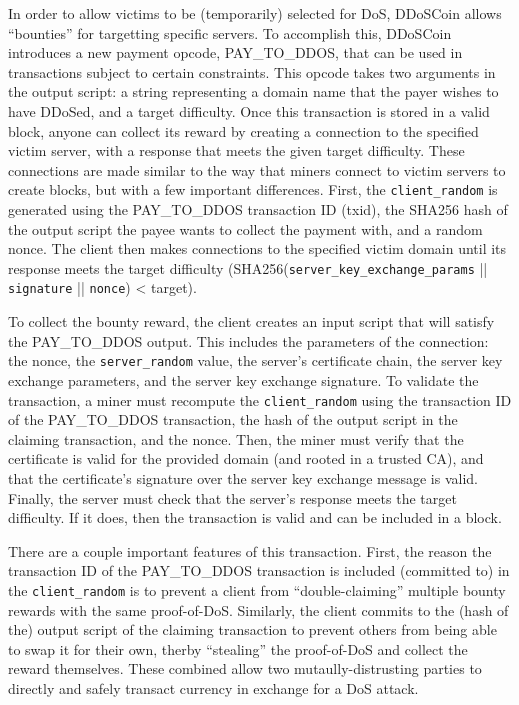 In order to allow victims to be (temporarily) selected for DoS, DDoSCoin
allows ``bounties'' for targetting specific servers. To accomplish this,
DDoSCoin introduces a new payment opcode, PAY\_TO\_DDOS, that can be used in
transactions subject to certain constraints. This opcode takes two arguments in
the output script: a
string representing a domain name that the payer wishes to have DDoSed, and a
target difficulty. Once this transaction is stored in a valid block, anyone can
collect its reward by creating a connection to the specified victim server, with
a response that meets the given target difficulty. These connections are made
similar to the way that miners connect to victim servers to create blocks, but
with a few important differences. First, the \texttt{client\_random} is
generated using the PAY\_TO\_DDOS transaction ID (txid), the SHA256 hash of the
output script the payee wants to collect the payment with, and a random nonce.
The client then makes connections to the specified victim domain until its
response meets the target difficulty
(SHA256(\texttt{server\_key\_exchange\_params} || \texttt{signature} ||
\texttt{nonce}) < target).

To collect the bounty reward, the client creates an input script that will
satisfy the PAY\_TO\_DDOS output. This includes the parameters of the
connection: the nonce, the \texttt{server\_random} value, the server's
certificate chain, the server key exchange parameters, and the server key
exchange signature. To validate the transaction, a miner must recompute the
\texttt{client\_random} using the transaction ID of the PAY\_TO\_DDOS
transaction, the hash of the output script in the claiming transaction, and the
nonce. Then, the miner must verify that the certificate is valid for the
provided domain (and rooted in a trusted CA), and that the certificate's
signature over the server key exchange message is valid. Finally, the server
must check that the server's response meets the target difficulty. If it does,
then the transaction is valid and can be included in a block.

There are a couple important features of this transaction. First, the reason the
transaction ID of the PAY\_TO\_DDOS transaction is included (committed to) in
the \texttt{client\_random} is to prevent a client from ``double-claiming''
multiple bounty rewards with the same proof-of-DoS. Similarly, the client
commits to the (hash of the) output script of the claiming transaction to
prevent others from being able to swap it for their own, therby ``stealing'' the
proof-of-DoS and collect the reward themselves. These combined allow two
mutaully-distrusting parties to directly and safely transact currency in
exchange for a DoS attack.


